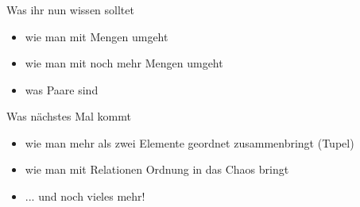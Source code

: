 \begin{frame}
	\frametitle{}
	
	\begin{block}{Was ihr nun wissen solltet}
		\begin{itemize}
			\item wie man mit Mengen umgeht
			\item wie man mit noch mehr Mengen umgeht
			\item was Paare sind
		\end{itemize}
	\end{block}

	\begin{block}{Was nächstes Mal kommt}
		\begin{itemize}
			\item wie man mehr als zwei Elemente geordnet zusammenbringt (Tupel)
			\item wie man mit Relationen Ordnung in das Chaos bringt
			\item ... und noch vieles mehr!
		\end{itemize}
	\end{block}
\end{frame}


\slideThanks


